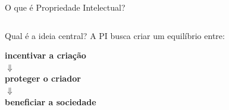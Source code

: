 \documentclass[9pt]{beamer}
\begin{document}
\begin{frame}{O que é Propriedade Intelectual?}
\begin{columns}[T]
    \begin{block}{Qual é a ideia central?}
      \small
      A PI busca criar um equilíbrio entre:

      \vspace{0.15cm}

      \centering
      \textbf{incentivar a criação}\\
      $\Downarrow$\\
      \textbf{proteger o criador}\\
      $\Downarrow$\\
      \textbf{beneficiar a sociedade}
    \end{block}

  \end{columns}

\end{frame}
\end{document}

